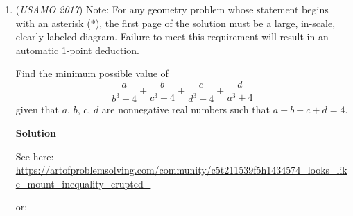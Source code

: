 \begin{enumerate}
 It suffices to show that any $c=2^{k}$ works given $k<0.5$. Note that the two smallest distances between any two points in the starting grid are $1$ and $\sqrt{2}$. When we are currently in state $S$ using label $I$, it is obvious that if $2ki-i\le{1}$, we can break out of state $S$ (Our effective minimum length would be at most 1, and we can cover every remaining point). Because $k<0.5$, there does exist an $I$ where this occurs. Thus, any $c<\sqrt{2}$ works, hence proved. $\blacksquare{}$ ~SigmaPiE

 


	\item (\textit{USAMO 2017}) Note: For any geometry problem whose statement begins with an asterisk ($*$), the first page of the solution must be a large, in-scale, clearly labeled diagram. Failure to meet this requirement will result in an automatic 1-point deduction. 


 Find the minimum possible value of 
 \[\frac{a}{b^3+4}+\frac{b}{c^3+4}+\frac{c}{d^3+4}+\frac{d}{a^3+4}\]given that $a$, $b$, $c$, $d$ are nonnegative real numbers such that $a+b+c+d=4$.


 



\textbf{Solution}

See here: \href{https://artofproblemsolving.com/community/c5t211539f5h1434574\_looks\_like\_mount\_inequality\_erupted\_}{https://artofproblemsolving.com/community/c5t211539f5h1434574\_looks\_like\_mount\_inequality\_erupted\_}

 or:

 


\end{enumerate}